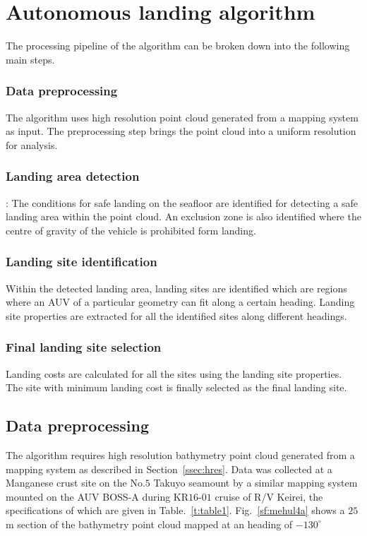 \section{Autonomous landing algorithm}
\label{sec:algo}

The processing pipeline of the algorithm can be broken down into the following main steps.

\subsubsection{Data preprocessing} The algorithm uses high resolution point cloud generated from a mapping system as input. The preprocessing step brings the point cloud into a uniform resolution for analysis.

\subsubsection{Landing area detection}: The conditions for safe landing on the seafloor are identified for detecting a safe landing area within the point cloud. An exclusion zone is also identified where the centre of gravity of the vehicle is prohibited form landing.
 
\subsubsection{Landing site identification} Within the detected landing area, landing sites are identified which are regions where an AUV of a particular geometry can fit along a certain heading. Landing site properties are extracted for all the identified sites along different headings. 

\subsubsection{Final landing site selection} Landing costs are calculated for all the sites using the landing site properties. The site with minimum landing cost is finally selected as the final landing site.

\subsection{Data preprocessing}
\label{sub:mapping}

The algorithm requires high resolution bathymetry point cloud generated from a  mapping system as described in Section~\ref{ssec:hres}. Data was collected at a Manganese crust site on the No.$5$ Takuyo seamount by a similar mapping system mounted on the AUV BOSS-A during KR$16$-$01$ cruise of R/V Keirei, the specifications of which are given in Table.~\ref{t:table1}. Fig.~\ref{sf:mehul4a} shows a $25$ m section of the bathymetry point cloud mapped at an heading of $-130^\circ$ 

